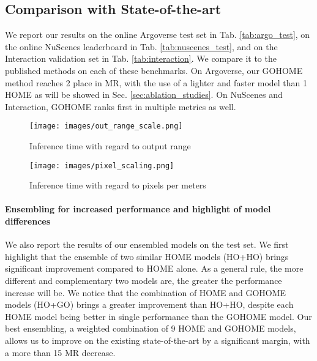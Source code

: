 \documentclass[letterpaper, 10 pt, conference]{ieeeconf}
\begin{document}
\subsection{Comparison with State-of-the-art}
\label{sec:sota}

We report our results on the online Argoverse test set in Tab. \ref{tab:argo_test}, on the online NuScenes leaderboard in Tab. \ref{tab:nuscenes_test}, and on the Interaction validation set in Tab. \ref{tab:interaction}. We compare it to the published methods on each of these benchmarks.
On Argoverse, our GOHOME method reaches 2 place in MR, with the use of a lighter and faster model than 1 HOME as will be showed in Sec. \ref{sec:ablation_studies}. 
On NuScenes and Interaction, GOHOME ranks first in multiple metrics as well.




\begin{figure*}[b]
    \center
    \begin{minipage}[b]{0.45\textwidth}
        \texttt{[image: images/out\_range\_scale.png]}
        \caption{Inference time with regard to output range}
        \label{fig:out_scale}
    \end{minipage}
    \begin{minipage}[b]{0.45\textwidth}
        \texttt{[image: images/pixel\_scaling.png]}
        \caption{Inference time with regard to pixels per meters}
        \label{fig:pixel_scale}
    \end{minipage}
\label{fig:resdi}
\end{figure*}


\paragraph{Ensembling for increased performance and highlight of model differences} We also report the results of our ensembled models on the test set. We first highlight that the ensemble of two similar HOME models (HO+HO) brings significant improvement compared to HOME alone. As a general rule, the more different and complementary two models are, the greater the performance increase will be. We notice that the combination of HOME and GOHOME models (HO+GO) brings a greater improvement than HO+HO, despite each HOME model being better in single performance than the GOHOME model. Our best ensembling, a weighted combination of 9 HOME and GOHOME models, allows us to improve on the existing state-of-the-art by a significant margin, with a more than 15 MR decrease.
\end{document}
